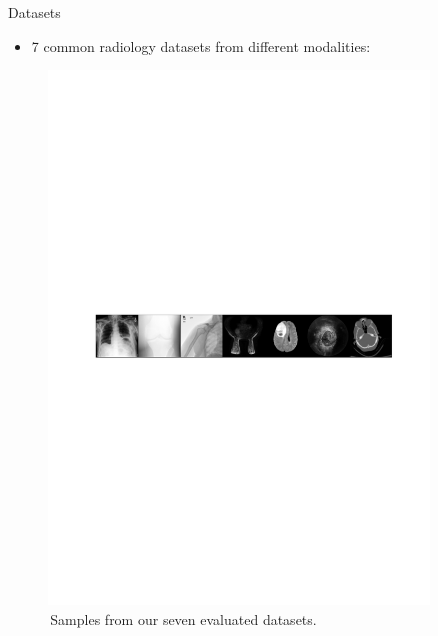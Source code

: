 \documentclass[final,hyperref={pdfpagelabels=false}]{beamer}
\begin{document}
\begin{frame}[t]
\begin{columns}[t]
\begin{column}{.3\textwidth}
\begin{block}{Datasets}
\begin{itemize}
\item 7 common radiology datasets from different modalities:
\end{itemize}
\begin{figure}
    \includegraphics[width=0.95\linewidth]{frompaper/data_eg_1row.pdf}
    \caption{\,Samples from our seven evaluated datasets.}
\end{figure}

\end{block}


\end{column} %
\begin{column}{.03\textwidth}\end{column} %

 
\begin{column}{.3\textwidth} %


\end{column}
\end{columns}
\end{frame}
\end{document}
